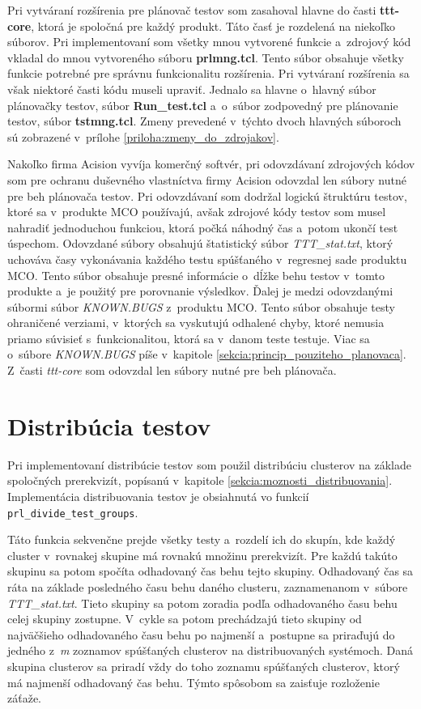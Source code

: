 Pri vytváraní rozšírenia pre plánovač testov som zasahoval hlavne do 
časti \textbf{ttt-core}, ktorá je spoločná pre každý produkt.
Táto časť je rozdelená na niekoľko súborov. Pri implementovaní som všetky 
mnou vytvorené funkcie a~zdrojový kód vkladal do mnou vytvoreného súboru 
\textbf{prlmng.tcl}. 
Tento súbor obsahuje všetky funkcie potrebné pre správnu funkcionalitu 
rozšírenia. Pri vytváraní rozšírenia sa však niektoré časti kódu 
museli upraviť. 
Jednalo sa hlavne o~hlavný súbor plánovačky testov, súbor
\textbf{Run\_test.tcl} a~o~súbor zodpovedný pre plánovanie testov, 
súbor \textbf{tstmng.tcl}. 
Zmeny prevedené v~týchto dvoch hlavných súboroch sú zobrazené 
v~prílohe \ref{priloha:zmeny_do_zdrojakov}.

Nakoľko firma Acision vyvíja komerčný softvér, pri odovzdávaní zdrojových 
kódov  som pre ochranu duševného vlastníctva firmy Acision odovzdal len 
súbory nutné pre beh plánovača testov. 
Pri odovzdávaní som dodržal logickú štruktúru testov, ktoré sa
v~produkte MCO používajú, avšak zdrojové kódy testov som musel nahradiť 
jednoduchou funkciou, ktorá počká náhodný čas a~potom ukončí test úspechom.
Odovzdané súbory obsahujú štatistický súbor \textit{TTT\_stat.txt}, 
ktorý uchováva časy vykonávania každého testu spúšťaného v~regresnej 
sade produktu MCO. Tento súbor obsahuje presné informácie o~dĺžke
behu testov v~tomto produkte a~je použitý pre porovnanie výsledkov.
Ďalej je medzi odovzdanými súbormi súbor \textit{KNOWN.BUGS} z~produktu MCO. 
Tento súbor obsahuje testy ohraničené verziami, v~ktorých sa vyskutujú 
odhalené chyby, ktoré nemusia priamo súvisieť s~funkcionalitou, ktorá sa 
v~danom teste testuje. Viac sa o~súbore \textit{KNOWN.BUGS} píše v~kapitole 
\ref{sekcia:princip_pouziteho_planovaca}.
Z~časti \textit{ttt-core} som odovzdal len súbory nutné pre beh plánovača. 

\section{Distribúcia testov}
\label{sekcia:distribucia_testov}
Pri implementovaní distribúcie testov som použil distribúciu clusterov 
na základe spoločných prerekvizít,  popísanú v~kapitole 
\ref{sekcia:moznosti_distribuovania}.
Implementácia distribuovania testov je obsiahnutá vo funkcií 
\texttt{prl\_divide\_test\_groups}.

Táto funkcia sekvenčne prejde všetky testy a~rozdelí ich do skupín, 
kde každý cluster v~rovnakej skupine má rovnakú množinu prerekvizít. 
Pre každú takúto skupinu sa potom spočíta odhadovaný čas behu tejto skupiny.
Odhadovaný čas sa ráta na základe posledného času behu daného clusteru, 
zaznamenanom v~súbore \textit{TTT\_stat.txt}.
Tieto skupiny sa potom zoradia podľa odhadovaného času behu celej 
skupiny zostupne. V~cykle sa potom prechádzajú tieto skupiny od 
najväčšieho odhadovaného času behu po najmenší a~postupne sa priraďujú 
do jedného z~\emph{m} zoznamov spúšťaných clusterov na distribuovaných systémoch.
Daná skupina clusterov sa priradí vždy do toho zoznamu spúšťaných clusterov, 
ktorý má najmenší odhadovaný čas behu. 
Týmto spôsobom sa zaisťuje rozloženie záťaže. 

